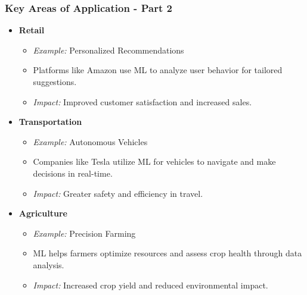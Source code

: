 \documentclass[aspectratio=169]{beamer}
\begin{document}
\begin{frame}[fragile]
    \frametitle{Key Areas of Application - Part 2}
    \begin{itemize}
        \item \textbf{Retail}
            \begin{itemize}
                \item \textit{Example:} Personalized Recommendations
                \item Platforms like Amazon use ML to analyze user behavior for tailored suggestions.
                \item \textit{Impact:} Improved customer satisfaction and increased sales.
            \end{itemize}
        \item \textbf{Transportation}
            \begin{itemize}
                \item \textit{Example:} Autonomous Vehicles
                \item Companies like Tesla utilize ML for vehicles to navigate and make decisions in real-time.
                \item \textit{Impact:} Greater safety and efficiency in travel.
            \end{itemize}
        \item \textbf{Agriculture}
            \begin{itemize}
                \item \textit{Example:} Precision Farming
                \item ML helps farmers optimize resources and assess crop health through data analysis.
                \item \textit{Impact:} Increased crop yield and reduced environmental impact.
            \end{itemize}
    \end{itemize}
\end{frame}
\end{document}

